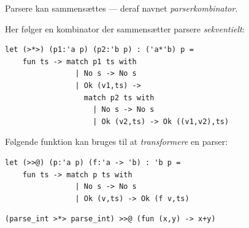 \documentclass[rgb]{beamer}
\begin{document}
\begin{frame}[fragile]
\begin{footnotesize}


  Parsere kan sammensættes --- deraf navnet \emph{parserkombinator}.

  \vspace{1ex}

  Her følger en kombinator der sammensætter parsere \emph{sekventielt}:

  \vspace{1ex}

\begin{lstlisting}[numbers=none,frame=none,mathescape]
  let (>*>) (p1:'a p) (p2:'b p) : ('a*'b) p =
    fun ts -> match p1 ts with
                | No s -> No s
                | Ok (v1,ts) ->
                  match p2 ts with
                    | No s -> No s
                    | Ok (v2,ts) -> Ok ((v1,v2),ts)
\end{lstlisting}

  \vspace{1ex}

  Følgende funktion kan bruges til at \emph{transformere} en parser:

  \vspace{1ex}

\begin{lstlisting}[numbers=none,frame=none,mathescape]
  let (>>@) (p:'a p) (f:'a -> 'b) : 'b p =
    fun ts -> match p ts with
                | No s -> No s
                | Ok (v,ts) -> Ok (f v,ts)
\end{lstlisting}

\vspace{-2mm}

\begin{lstlisting}[numbers=none,frame=none,mathescape]
  (parse_int >*> parse_int) >>@ (fun (x,y) -> x+y)
\end{lstlisting}

\end{footnotesize}
\end{frame}
\end{document}
